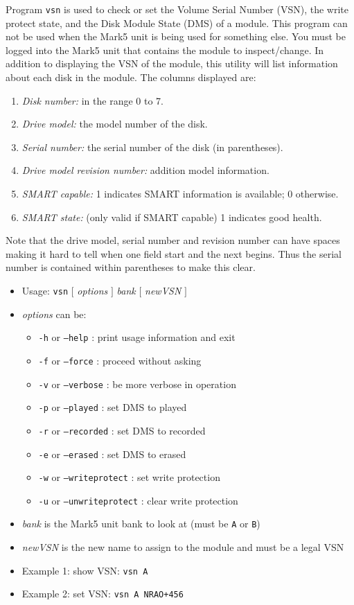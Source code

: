 Program {\tt vsn} is used to check or set the Volume Serial Number (VSN), the write protect state, and the Disk Module State (DMS) of a module.
This program can not be used when the Mark5 unit is being used for something else.
You must be logged into the Mark5 unit that contains the module to inspect/change.
In addition to displaying the VSN of the module, this utility will list information about each disk in the module.
The columns displayed are:

\begin{enumerate}
\item {\em Disk number:} in the range 0 to 7.
\item {\em Drive model:} the model number of the disk.
\item {\em Serial number:} the serial number of the disk (in parentheses).
\item {\em Drive model revision number:} addition model information.
\item {\em SMART capable:} 1 indicates SMART information is available; 0 otherwise.
\item {\em SMART state:} (only valid if SMART capable) 1 indicates good health.
\end{enumerate}

Note that the drive model, serial number and revision number can have spaces making it hard to tell when one field start and the next begins.
Thus the serial number is contained within parentheses to make this clear.

\begin{itemize}
\item[] Usage: {\tt vsn} $[$ {\em options} $]$ {\em bank} $[$ {\em newVSN} $]$
\item[] {\em options} can be:
\begin{itemize}
\item[] {\tt -h} or {\tt --help} : print usage information and exit
\item[] {\tt -f} or {\tt --force} : proceed without asking
\item[] {\tt -v} or {\tt --verbose} : be more verbose in operation
\item[] {\tt -p} or {\tt --played} : set DMS to played
\item[] {\tt -r} or {\tt --recorded} : set DMS to recorded
\item[] {\tt -e} or {\tt --erased} : set DMS to erased
\item[] {\tt -w} or {\tt --writeprotect} : set write protection
\item[] {\tt -u} or {\tt --unwriteprotect} : clear write protection
\end{itemize}
\item[] {\em bank} is the Mark5 unit bank to look at (must be {\tt A} or {\tt B})
\item[] {\em newVSN} is the new name to assign to the module and must be a legal VSN
\item[] Example 1: show VSN: {\tt vsn A}
\item[] Example 2: set VSN: {\tt vsn A NRAO+456}
\end{itemize}

